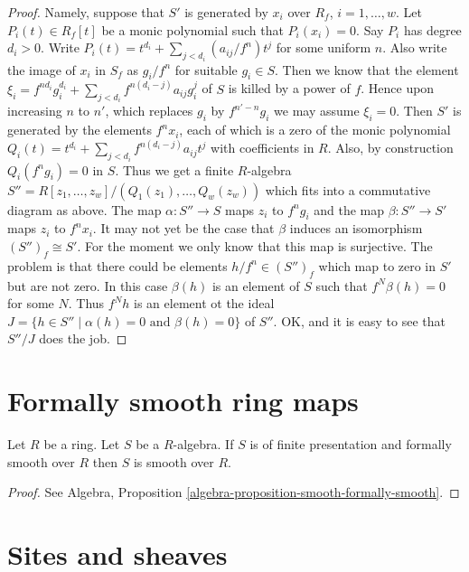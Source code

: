 \begin{proof}
Namely, suppose that $S'$ is generated by
$x_i$ over $R_f$, $i = 1, \ldots, w$. Let $P_i(t) \in R_f[t]$
be a monic polynomial such that $P_i(x_i) = 0$.
Say $P_i$ has degree $d_i > 0$. Write
$P_i(t) = t^{d_i} + \sum_{j < d_i} (a_{ij}/f^n) t^j$
for some uniform $n$. Also write
the image of $x_i$ in $S_f$ as $g_i / f^n$
for suitable $g_i \in S$. Then we know
that the element
$\xi_i = f^{nd_i} g_i^{d_i} + \sum_{j < d_i} f^{n(d_i - j)} a_{ij} g_i^j$
of $S$ is killed by a power of $f$.
Hence upon increasing $n$ to $n'$, which replaces
$g_i$ by $f^{n' - n}g_i$ we may assume $\xi_i = 0$.
Then $S'$ is generated by the elements
$f^n x_i$, each of which is a zero of the
monic polynomial $Q_i(t) = t^{d_i} +
\sum_{j < d_i} f^{n(d_i - j)} a_{ij} t^j$
with coefficients in $R$. Also, by construction
$Q_i(f^ng_i) = 0$ in $S$. Thus we get a finite $R$-algebra
$S'' = R[z_1, \ldots, z_w]/(Q_1(z_1), \ldots, Q_w(z_w))$
which fits into a commutative diagram as above.
The map $\alpha : S'' \to S$ maps $z_i$ to $f^ng_i$ and
the map $\beta : S'' \to S'$ maps $z_i$ to $f^nx_i$.
It may not yet be the case that $\beta$ induces an
isomorphism $(S'')_f \cong S'$.
For the moment we only know that this map
is surjective. The problem is that there could be
elements $h/f^n \in (S'')_f$ which map to zero
in $S'$ but are not zero. In this case $\beta(h)$
is an element of $S$ such that $f^N \beta(h) = 0$
for some $N$. Thus $f^N h$ is an element ot the ideal
$J = \{h \in S'' \mid \alpha(h) = 0 \text{ and }
\beta(h) = 0\}$ of $S''$. OK, and it is easy to see that
$S''/J$ does the job.
\end{proof}


\section{Formally smooth ring maps}
\label{section-formally-smooth}

\begin{lemma}
\label{lemma-formally-smooth-smooth}
Let $R$ be a ring. Let $S$ be a $R$-algebra.
If $S$ is of finite presentation and formally smooth over $R$
then $S$ is smooth over $R$.
\end{lemma}

\begin{proof}
See Algebra, Proposition \ref{algebra-proposition-smooth-formally-smooth}.
\end{proof}




\section{Sites and sheaves}
\label{section-sites}

